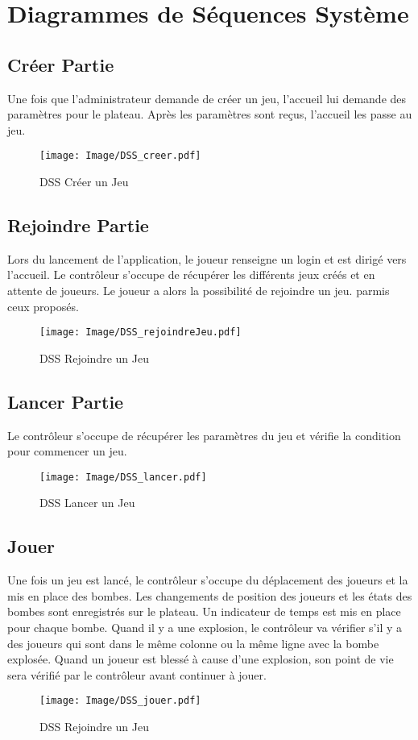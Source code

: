 \section{Diagrammes de Séquences Système}
\subsection{Créer Partie}
Une fois que l'administrateur demande de créer un jeu, l'accueil lui
demande des paramètres pour le plateau. Après les paramètres sont reçus, l'accueil les passe au jeu.

\begin{figure}[h!]
	\centering
	\texttt{[image: Image/DSS\_creer.pdf]}
	\caption{DSS Créer un Jeu}
\end{figure}
\newpage

\subsection{Rejoindre Partie}
Lors du lancement de l'application, le joueur renseigne un login et est dirigé vers l'accueil. Le contrôleur s'occupe de récupérer les différents jeux créés et en attente de joueurs.
Le joueur a alors la possibilité de rejoindre un jeu. parmis ceux proposés.

\begin{figure}[h!]
	\centering
	\texttt{[image: Image/DSS\_rejoindreJeu.pdf]}
	\caption{DSS Rejoindre un Jeu}
\end{figure}
\newpage

\subsection{Lancer Partie}
Le contrôleur s'occupe de récupérer les paramètres du jeu et vérifie la condition pour commencer un jeu.
\begin{figure}[h!]
	\centering
	\texttt{[image: Image/DSS\_lancer.pdf]}
	\caption{DSS Lancer un Jeu}
\end{figure}
\newpage

\subsection{Jouer}
Une fois un jeu est lancé, le contrôleur s'occupe du déplacement des joueurs et la mis en place des bombes. Les changements de position des joueurs et les états des bombes sont enregistrés sur le plateau. Un indicateur de temps est mis en place pour chaque bombe. Quand il y a une explosion, le contrôleur va vérifier s'il y a des joueurs qui sont dans le même colonne ou la même ligne avec la bombe explosée. Quand un joueur est blessé à cause d'une explosion, son point de vie sera vérifié par le contrôleur avant continuer à jouer.
\begin{figure}[h!]
	\centering
	\texttt{[image: Image/DSS\_jouer.pdf]}
	\caption{DSS Rejoindre un Jeu}
\end{figure}
\newpage

